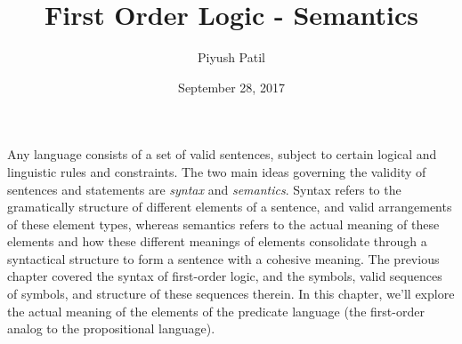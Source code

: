 \documentclass{article}
\begin{document}
\newcommand{\N}{\mathbb{N}}
\newcommand{\Z}{\mathbb{Z}}
\newcommand{\Q}{\mathbb{Q}}
\newcommand{\R}{\mathbb{R}}
\newcommand{\T}{\text{\normalfont\ T}}
\newcommand{\F}{\text{\normalfont\ F}}
\newcommand{\ti}{\textit}
\newcommand{\tb}{\textbf}
\newcommand{\n}{\leavevmode \newline}
\newcommand{\nn}{\leavevmode \newline \newline}
\def \Def#1#2{\begin{adjustwidth}{0.85cm}{0.85cm} \tb{(Definition) #1}: \ti{#2} \end{adjustwidth}}
\def \nDef#1#2{\n \Def{#1}{#2}}
\def \Defn#1#2{\Def{#1}{#2} \n}
\def \nDefn#1#2{\n \Defn{#1}{#2}}
\def \Defcont#1{\begin{adjustwidth}{0.85cm}{0.85cm} \ti{#1} \end{adjustwidth} \n}
\def \InDef#1{\ti{\begin{adjustwidth}{0.85cm}{0.85cm} #1 \end{adjustwidth}}}
\def \Thm#1#2{\begin{adjustwidth}{0.85cm}{0.85cm} \tb{(Theorem) #1}: \ti{#2} \end{adjustwidth}}
\def \nThm#1#2{\n \Thm{#1}{#2}}
\def \Thmn#1#2{\Thm{#1}{#2} \n}
\def \nThmn#1#2{\n \Thmn{#1}{#2}}
\def \InThm#1{\ti{\begin{adjustwidth}{0.85cm}{0.85cm} #1 \end{adjustwidth}}}
\def \Pf#1{\begin{adjustwidth}{0.85cm}{0.85cm} \textit{Proof}: #1 \qedsymbol \end{adjustwidth} \n}
\newcommand{\st}{\textnormal{ s.t. }}
\newcommand{\proplang}{\mathcal{L}_0}
\newcommand{\predlang}{\mathcal{L}}
\newcommand{\M}{\mathcal{M}}
\newcommand{\A}{\mathcal{A}}
\newcommand{\LA}{\predlang_\A}

\title{First Order Logic - Semantics}
\author{Piyush Patil}
\date{September 28, 2017}
\maketitle

Any language consists of a set of valid sentences, subject to certain logical and linguistic rules and constraints. The two main ideas governing the validity of sentences and statements are \ti{syntax} and \ti{semantics}. Syntax refers to the gramatically structure of different elements of a sentence, and valid arrangements of these element types, whereas semantics refers to the actual meaning of these elements and how these different meanings of elements consolidate through a syntactical structure to form a sentence with a cohesive meaning. The previous chapter covered the syntax of first-order logic, and the symbols, valid sequences of symbols, and structure of these sequences therein. In this chapter, we'll explore the actual meaning of the elements of the predicate language (the first-order analog to the propositional language).
\end{document}
